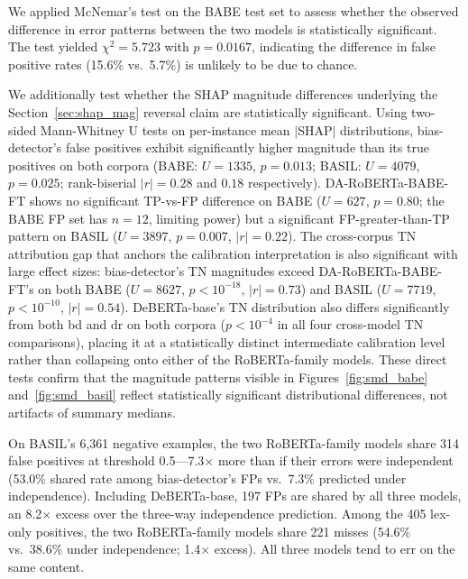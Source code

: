 \documentclass[11pt]{article}
\begin{document}
We applied McNemar's test on the BABE test set to assess whether the 
observed difference in error patterns between the two models is 
statistically significant. The test yielded $\chi^2 = 5.723$ with 
$p = 0.0167$, indicating the difference in false positive rates 
(15.6\% vs.\ 5.7\%) is unlikely to be due to chance.


We additionally test whether the SHAP magnitude differences underlying 
the Section~\ref{sec:shap_mag} reversal claim are statistically 
significant. Using two-sided Mann-Whitney U tests on per-instance 
mean $|$SHAP$|$ distributions, bias-detector's false positives 
exhibit significantly higher magnitude than its true positives on 
both corpora (BABE: $U = 1335$, $p = 0.013$; BASIL: $U = 4079$, 
$p = 0.025$; rank-biserial $|r| = 0.28$ and $0.18$ respectively). 
DA-RoBERTa-BABE-FT shows no significant TP-vs-FP difference on BABE 
($U = 627$, $p = 0.80$; the BABE FP set has $n = 12$, limiting 
power) but a significant FP-greater-than-TP pattern on BASIL 
($U = 3897$, $p = 0.007$, $|r| = 0.22$). The cross-corpus TN 
attribution gap that anchors the calibration interpretation is also 
significant with large effect sizes: bias-detector's TN magnitudes 
exceed DA-RoBERTa-BABE-FT's on both BABE ($U = 8627$, $p < 10^{-18}$, 
$|r| = 0.73$) and BASIL ($U = 7719$, $p < 10^{-10}$, $|r| = 0.54$). 
DeBERTa-base's TN distribution also differs significantly from both 
bd and dr on both corpora ($p < 10^{-4}$ in all four cross-model 
TN comparisons), placing it at a statistically distinct intermediate 
calibration level rather than collapsing onto either of the 
RoBERTa-family models. These direct tests confirm that the magnitude 
patterns visible in Figures~\ref{fig:smd_babe} 
and~\ref{fig:smd_basil} reflect statistically significant 
distributional differences, not artifacts of summary medians.

On BASIL's 6{,}361 negative examples, the two RoBERTa-family models 
share 314 false positives at threshold 0.5---7.3$\times$ more than if 
their errors were independent (53.0\% shared rate among bias-detector's 
FPs vs.\ 7.3\% predicted under independence). Including DeBERTa-base, 
197 FPs are shared by all three models, an 8.2$\times$ excess over 
the three-way independence prediction. Among the 405 lex-only positives, 
the two RoBERTa-family models share 221 misses (54.6\% vs.\ 38.6\% 
under independence; 1.4$\times$ excess). All three models tend to err 
on the same content.
\end{document}
